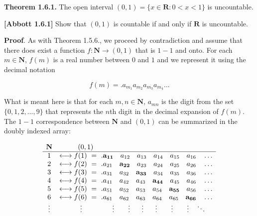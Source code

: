 \documentclass[10pt]{article}
\begin{document}
\textbf{Theorem 1.6.1. }The open interval $\displaystyle ( 0,1) =\{x\in \mathbf{R} :0< x< 1\}$ is uncountable.



\textbf{[Abbott 1.6.1]} Show that $\displaystyle ( 0,1)$ is countable if and only if $\displaystyle \mathbf{R}$ is uncountable. 



\textbf{Proof}. As with Theorem 1.5.6., we proceed by contradiction and assume that there does exist a function $\displaystyle f:\mathbf{N}\rightarrow ( 0,1)$ that is $\displaystyle 1-1$ and onto. For each $\displaystyle m\in \mathbf{N}$, $\displaystyle f( m)$ is a real number between $\displaystyle 0$ and $\displaystyle 1$ and we represent it using the decimal notation




\begin{equation*}
f( m) =.a_{m_{1}} a_{m_{2}} a_{m_{3}} a_{m_{4}} \dotsc 
\end{equation*}


What is meant here is that for each $\displaystyle m,n\in \mathbf{N}$, $\displaystyle a_{mn}$ is the digit from the set $\displaystyle \{0,1,2,\dotsc ,9\}$ that represents the $\displaystyle n$th digit in the decimal expansion of $\displaystyle f( m)$. The $\displaystyle 1-1$ correspondence between $\displaystyle \mathbf{N}$ and $\displaystyle ( 0,1)$ can be summarized in the doubly indexed array:




\begin{equation*}
\begin{array}{ c l }
\mathbf{N} & \ \ \ \ \ \ \ \ ( 0,1)\\
\hline
1 & \longleftrightarrow f( 1) \ =\ .\mathbf{a_{11}} \quad a_{12} \quad a_{13} \quad a_{14} \quad a_{15} \quad a_{16} \quad \dotsc \\
2 & \longleftrightarrow f( 2) \ =\ .a_{21} \quad \mathbf{a_{22}} \quad a_{23} \quad a_{24} \quad a_{25} \quad a_{26} \quad \dotsc \\
3 & \longleftrightarrow f( 3) \ =\ .a_{31} \quad a_{32} \quad \mathbf{a_{33}} \quad a_{34} \quad a_{35} \quad a_{36} \quad \dotsc \\
4 & \longleftrightarrow f( 4) \ =\ .a_{41} \quad a_{42} \quad a_{43} \quad \mathbf{a_{44}} \quad a_{45} \quad a_{46} \quad \dotsc \\
5 & \longleftrightarrow f( 5) \ =\ .a_{51} \quad a_{52} \quad a_{53} \quad a_{54} \quad \mathbf{a_{55}} \quad a_{56} \quad \dotsc \\
6 & \longleftrightarrow f( 6) \ =\ .a_{61} \quad a_{62} \quad a_{63} \quad a_{64} \quad a_{65} \quad \mathbf{a_{66}} \quad \dotsc \\
\vdots  & \ \ \ \ \ \ \ \ \ \vdots \ \ \ \ \ \ \ \ \ \ \ \ \ \vdots \ \ \ \ \ \ \vdots \ \ \ \ \ \vdots \ \ \ \ \ \vdots \ \ \ \ \ \ \vdots \ \ \ \ \ \ \vdots \quad \ddots 
\end{array}
\end{equation*}
\end{document}

